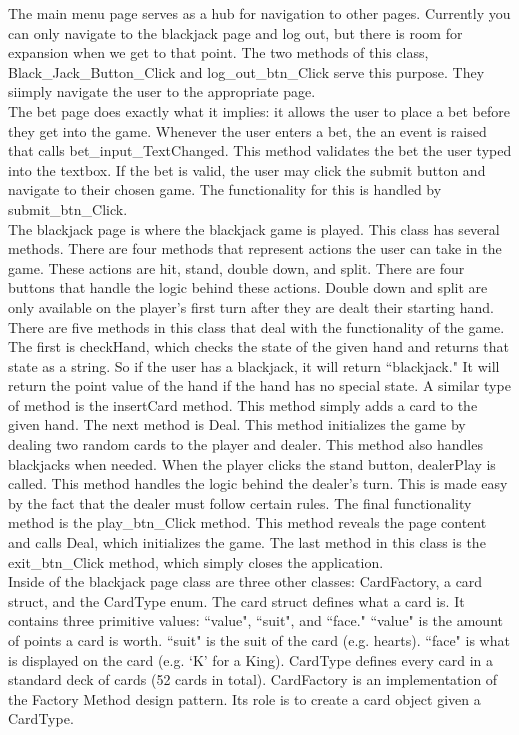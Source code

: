\documentclass[10pt,conference,onecolumn,compsoc]{IEEEtran}
\begin{document}
\newline
The main menu page serves as a hub for navigation to other pages. Currently you can only navigate to the blackjack page and log out, but there is room for expansion when we get to that point. The two methods of this class, Black\_Jack\_Button\_Click and log\_out\_btn\_Click serve this purpose. They siimply navigate the user to the appropriate page.\\
\newline
The bet page does exactly what it implies: it allows the user to place a bet before they get into the game. Whenever the user enters a bet, the an event is raised that calls bet\_input\_TextChanged. This method validates the bet the user typed into the textbox. If the bet is valid, the user may click the submit button and navigate to their chosen game. The functionality for this is handled by submit\_btn\_Click.\\
\newline
The blackjack page is where the blackjack game is played. This class has several methods. There are four methods that represent actions the user can take in the game. These actions are hit, stand, double down, and split. There are four buttons that handle the logic behind these actions. Double down and split are only available on the player's first turn after they are dealt their starting hand. There are five methods in this class that deal with the functionality of the game. The first is checkHand, which checks the state of the given hand and returns that state as a string. So if the user has a blackjack, it will return ``blackjack." It will return the point value of the hand if the hand has no special state. A similar type of method is the insertCard method. This method simply adds a card to the given hand. The next method is Deal. This method initializes the game by dealing two random cards to the player and dealer. This method also handles blackjacks when needed. When the player clicks the stand button, dealerPlay is called. This method handles the logic behind the dealer's turn. This is made easy by the fact that the dealer must follow certain rules. The final functionality method is the play\_btn\_Click method. This method reveals the page content and calls Deal, which initializes the game. The last method in this class is the exit\_btn\_Click method, which simply closes the application.\\
\newline
Inside of the blackjack page class are three other classes: CardFactory, a card struct, and the CardType enum. The card struct defines what a card is. It contains three primitive values: ``value", ``suit", and ``face." ``value" is the amount of points a card is worth. ``suit" is the suit of the card (e.g. hearts). ``face" is what is displayed on the card (e.g. `K' for a King). CardType defines every card in a standard deck of cards (52 cards in total). CardFactory is an implementation of the Factory Method design pattern. Its role is to create a card object given a CardType.
\end{document}
